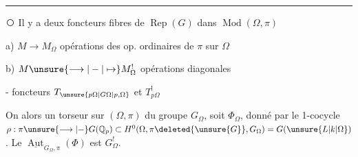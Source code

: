 
\noindent\rule{\linewidth}{0.4pt}

\textcircled{} Il y a deux foncteurs fibres de $\operatorname{Rep}(G)$ dans $\operatorname{Mod}(\Omega,\pi)$

a) $M\longrightarrow M_\Omega$ opérations  des op. ordinaires de $\pi$ sur $\Omega$

b) $M\unsure{\longrightarrow|\mathbin{-}|\mapsto}M_\Omega^{!}$ opérations diagonales

- foncteurs $T_{\unsure{p\Omega|G\Omega|p,\Omega}}$ et $T_{p\Omega}^{!}$

 On  alors un \deleted{\unsure{$(\Omega,\pi)$-}}torseur  sur $(\Omega,\pi)$ du groupe $G_\Omega$, soit $\Phi_\Omega$, donné par le 1-cocycle $\rho:\pi\unsure{\longrightarrow|\mathbin{-}}G(\mathbb Q_p)\subset H^0(\Omega,\pi\deleted{\unsure{G}},G_\Omega)=G(\unsure{L|k|\Omega})$. Le \inserted{$(\Omega,\pi)$-} $\underline{\operatorname{Aut}}_{G_\Omega,\pi}(\Phi)$ est $G_\Omega^{!}$.
